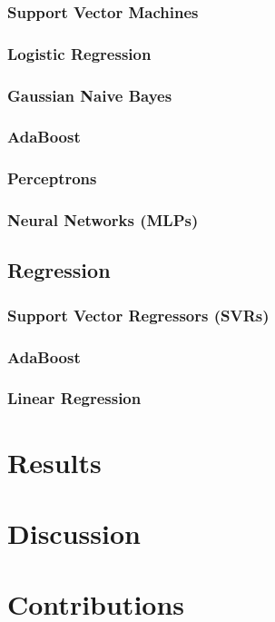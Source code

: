 \documentclass[journal,transmag]{IEEEtran}
\begin{document}
			\subsubsection{Support Vector Machines}
			
			\subsubsection{Logistic Regression}
			
			\subsubsection{Gaussian Naive Bayes}
			
			\subsubsection{AdaBoost}
			
			\subsubsection{Perceptrons}
			
			\subsubsection{Neural Networks (MLPs)}
			
		\subsection{Regression}
			
			\subsubsection{Support Vector Regressors (SVRs)}
			
			\subsubsection{AdaBoost}
			
			\subsubsection{Linear Regression}
	
	\section{Results}
	
	
	\section{Discussion}
	
	
	\section{Contributions}
	
	
\end{document}
